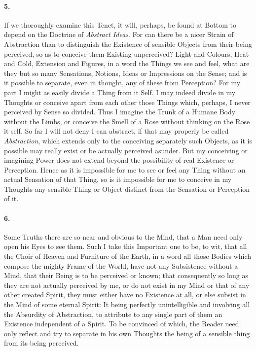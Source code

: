 \documentclass[]{article}
\newenvironment{sectionbody}{\begin{multicols}{2}}{\end{multicols}}
\begin{document}
\begin{sectionbody}
\paragraph{5.} If we thoroughly examine this Tenet, it will, perhaps, be found
at Bottom to depend on the Doctrine of \emph{Abstract Ideas}.  For
can there be a nicer Strain of Abstraction than to distinguish
the Existence of sensible Objects from their being perceived, so
as to conceive them Existing unperceived? Light and Colours, Heat
and Cold, Extension and Figures, in a word the Things we see and
feel, what are they but so many Sensations, Notions, Ideas or
Impressions on the Sense; and is it possible to separate, even in
thought, any of these from Perception? For my part I might as
easily divide a Thing from it Self.  I may indeed divide in my
Thoughts or conceive apart from each other those Things which,
perhaps, I never perceived by Sense so divided.  Thus I imagine
the Trunk of a Humane Body without the Limbs, or conceive the
Smell of a Rose without thinking on the Rose it self.  So far I
will not deny I can abstract, if that may properly be called
\emph{Abstraction}, which extends only to the conceiving
separately such Objects, as it is possible may really exist or be
actually perceived asunder.  But my conceiving or imagining Power
does not extend beyond the possibility of real Existence or
Perception.  Hence as it is impossible for me to see or feel any
Thing without an actual Sensation of that Thing, so is it
impossible for me to conceive in my Thoughts any sensible Thing
or Object distinct from the Sensation or Perception of it.



\paragraph{6.} Some Truths there are so near and obvious to the Mind, that a Man
need only open his Eyes to see them.  Such I take this Important
one to be, to wit, that all the Choir of Heaven and Furniture of
the Earth, in a word all those Bodies which compose the mighty
Frame of the World, have not any Subsistence without a Mind, that
their Being is to be perceived or known; that consequently so
long as they are not actually perceived by me, or do not exist in
my Mind or that of any other created Spirit, they must either
have no Existence at all, or else subsist in the Mind of some
eternal Spirit: It being perfectly unintelligible and involving
all the Absurdity of Abstraction, to attribute to any single part
of them an Existence independent of a Spirit.  To be convinced of
which, the Reader need only reflect and try to separate in his
own Thoughts the being of a sensible thing from its being
perceived.




\end{sectionbody}
\end{document}
